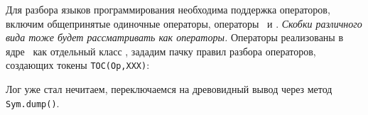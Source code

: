 \label{miniops}

Для разбора языков программирования необходима поддержка операторов,
включим общепринятые одиночные операторы, операторы \cpp\ и \bi.
\emph{Скобки различного вида тоже будет рассматривать как операторы.}
Операторы реализованы в ядре \bi\ как отдельный класс , зададим
пачку правил разбора операторов, создающих токены \verb|TOC(Op,XXX)|:



Лог уже стал нечитаем, переключаемся на древовидный вывод через метод
\verb|Sym.dump()|.





